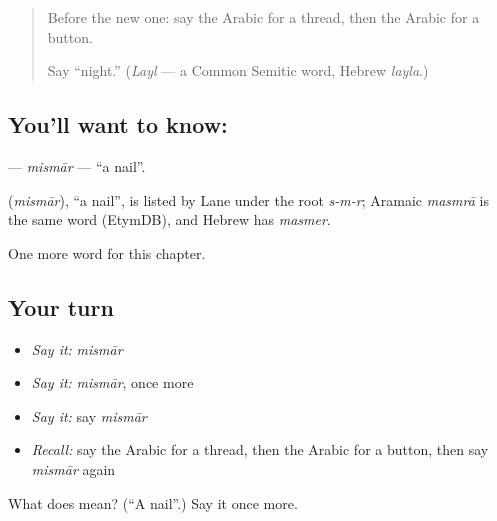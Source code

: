 \begin{quote}
Before the new one: say the Arabic for a thread, then the Arabic for a button.

Say \textquotedblleft{}night.\textquotedblright{} (\emph{Layl} — a Common Semitic word, Hebrew \emph{layla}.)
\end{quote}

\subsection*{You'll want to know: }
\textbf{} — \emph{mismār} — \textquotedblleft{}a nail\textquotedblright{}.

\begin{cousinweb}
\textbf{} (\emph{mismār}), \textquotedblleft{}a nail\textquotedblright{}, is listed by Lane under the root \emph{s-m-r}; Aramaic \emph{masmrā} is the same word (EtymDB), and Hebrew has \emph{masmer}.
\end{cousinweb}

\begin{grammarlens}[title={What you've built}]
One more word for this chapter.
\end{grammarlens}

\subsection*{Your turn}
\begin{itemize}
\raggedright
  \item \emph{Say it:} \emph{mismār}
  \item \emph{Say it:} \emph{mismār}, once more
  \item \emph{Say it:} say \emph{mismār}
  \item \emph{Recall:} say the Arabic for a thread, then the Arabic for a button, then say \emph{mismār} again
\end{itemize}

\begin{tcolorbox}[breakable,colback=teal!4,colframe=teal!35!black,title={Before you move on}]
What does  mean? (\textquotedblleft{}A nail\textquotedblright{}.) Say it once more.
\end{tcolorbox}
